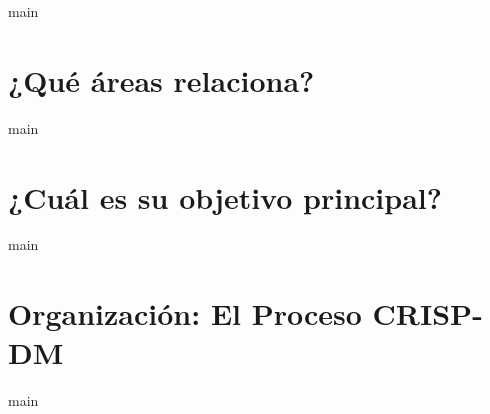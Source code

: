 {main}
\section{¿Qué áreas relaciona?}
{main}
\section{¿Cuál es su objetivo principal?}
{main}
\section{Organización: El Proceso CRISP-DM}
{main}